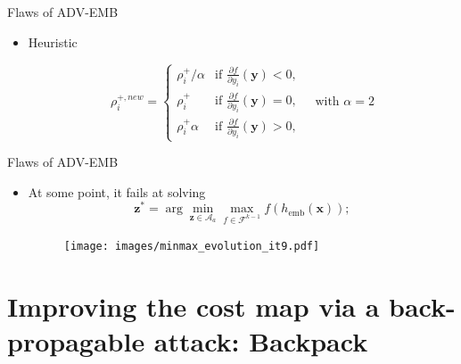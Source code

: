 \documentclass[10pt,aspectratio=169]{beamer}
\newcommand{\femb}{h_{\mathrm{emb}}}
\newcommand{\fset}{\mathcal{F}}
\begin{document}
\begin{frame}{Flaws of ADV-EMB}

    \begin{itemize}

        \item Heuristic
        
            \begin{equation}
                \rho_{i}^{+, new} = 
                \left\{
                    \begin{array}{ll}
                        \rho_{i}^+/\alpha & \mbox{if } \frac{\partial f}{\partial y_{i}}\left(\mathbf{y}\right) < 0, \\
                        \rho_{i}^+ & \mbox{if } \frac{\partial f}{\partial y_{i}}\left(\mathbf{y}\right) = 0, \\
                        \rho_{i}^+ \alpha & \mbox{if } \frac{\partial f}{\partial y_{i}}\left(\mathbf{y}\right) > 0,
                    \end{array}
                \right.
                \quad \mbox{with } \alpha = 2
            \end{equation}

    \end{itemize}

\end{frame}



\begin{frame}{Flaws of ADV-EMB}

    \begin{itemize}
            
        \item At some point, it fails at solving
            \begin{equation*}
                \mathbf{z}^\ast = \arg \min_{\mathbf{z} \in \mathcal{A}_a} \max_{f \in \fset^{k-1}} f(\femb(\mathbf{x}));
            \end{equation*} 
            
            \begin{figure}
                \texttt{[image: images/minmax\_evolution\_it9.pdf]}
             \end{figure}
              
    \end{itemize}

\end{frame}
    



\section{Improving the cost map via a back-propagable attack: Backpack}
\end{document}
